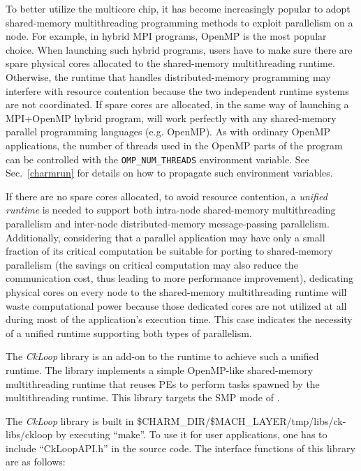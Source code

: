 To better utilize the multicore chip, it has become increasingly popular to
adopt shared-memory multithreading programming methods to exploit parallelism
on a node. For example, in hybrid MPI programs, OpenMP is the most popular
choice.  When launching such hybrid programs, users have to make sure there are
spare physical cores allocated to the shared-memory multithreading runtime.
Otherwise, the runtime that handles distributed-memory programming may
interfere with resource contention because the two independent runtime systems
are not coordinated.  If spare cores are allocated, in the same way of
launching a MPI+OpenMP hybrid program, \charmpp{} will work perfectly with any
shared-memory parallel programming languages (e.g. OpenMP). As with ordinary
OpenMP applications, the number of threads used in the OpenMP parts of the
program can be controlled with the {\tt OMP\_NUM\_THREADS} environment
variable.  See Sec.~\ref{charmrun} for details on how to propagate such
environment variables.

If there are no spare cores allocated, to avoid resource contention, a
\emph{unified runtime} is needed to support both intra-node shared-memory
multithreading parallelism and inter-node distributed-memory
message-passing parallelism. Additionally, considering that a parallel
application may have only a small fraction of its critical computation be
suitable for porting to shared-memory parallelism (the savings on critical
computation may also reduce the communication cost, thus leading to more
performance improvement), dedicating physical cores on every node to the
shared-memory multithreading runtime will waste computational power because
those dedicated cores are not utilized at all during most of the application's
execution time. This case indicates the necessity of a unified
runtime supporting both types of parallelism.

The \emph{CkLoop} library is an add-on to the \charmpp{} runtime to achieve such
a unified runtime.  The library implements a simple OpenMP-like shared-memory
multithreading runtime that reuses \charmpp{} PEs to perform tasks spawned by
the multithreading runtime. This library targets the SMP mode of \charmpp{}.

The \emph{CkLoop} library is built in
\$CHARM\_DIR/\$MACH\_LAYER/tmp/libs/ck-libs/ckloop by executing ``make''.
To use it for user applications, one has to include ``CkLoopAPI.h'' in
the source code. The interface functions of this library are as
follows:

